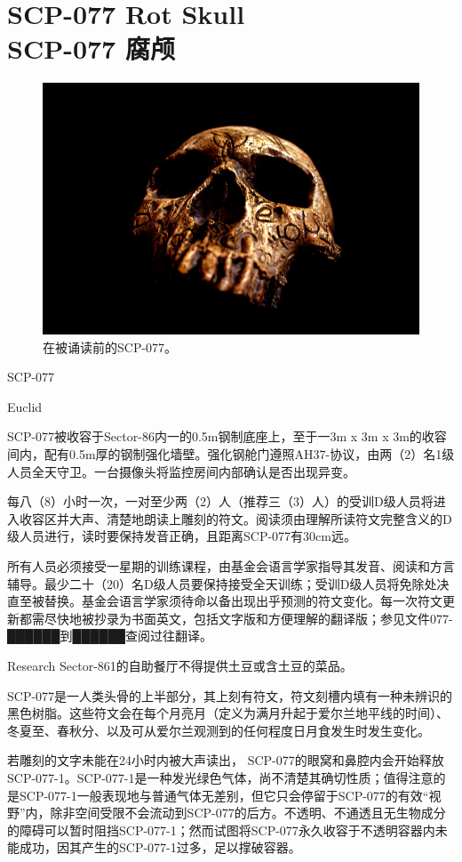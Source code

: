 \chapter[SCP-077 腐颅]{
    SCP-077 Rot Skull\\
    SCP-077 腐颅
}

\label{chap:SCP-077}

\begin{figure}[H]
    \centering
    \includegraphics[width=0.5\linewidth]{images/SCP-077.jpg}
    \caption*{在被诵读前的SCP-077。}
\end{figure}

SCP-077

Euclid

SCP-077被收容于Sector-86内一的0.5m钢制底座上，至于一3m x 3m x 3m的收容间内，配有0.5m厚的钢制强化墙壁。强化钢舱门遵照AH37-协议，由两（2）名1级人员全天守卫。一台摄像头将监控房间内部确认是否出现异变。

每八（8）小时一次，一对至少两（2）人（推荐三（3）人）的受训D级人员将进入收容区并大声、清楚地朗读上雕刻的符文。阅读须由理解所读符文完整含义的D级人员进行，读时要保持发音正确，且距离SCP-077有30cm远。

所有人员必须接受一星期的训练课程，由基金会语言学家指导其发音、阅读和方言辅导。最少二十（20）名D级人员要保持接受全天训练；受训D级人员将免除处决直至被替换。基金会语言学家须待命以备出现出乎预测的符文变化。每一次符文更新都需尽快地被抄录为书面英文，包括文字版和方便理解的翻译版；参见文件077-██████到██████查阅过往翻译。

Research Sector-861的自助餐厅不得提供土豆或含土豆的菜品。

SCP-077是一人类头骨的上半部分，其上刻有符文，符文刻槽内填有一种未辨识的黑色树脂。这些符文会在每个月亮月（定义为满月升起于爱尔兰地平线的时间）、冬夏至、春秋分、以及可从爱尔兰观测到的任何程度日月食发生时发生变化。

若雕刻的文字未能在24小时内被大声读出， SCP-077的眼窝和鼻腔内会开始释放SCP-077-1。SCP-077-1是一种发光绿色气体，尚不清楚其确切性质；值得注意的是SCP-077-1一般表现地与普通气体无差别，但它只会停留于SCP-077的有效“视野”内，除非空间受限不会流动到SCP-077的后方。不透明、不通透且无生物成分的障碍可以暂时阻挡SCP-077-1；然而试图将SCP-077永久收容于不透明容器内未能成功，因其产生的SCP-077-1过多，足以撑破容器。

